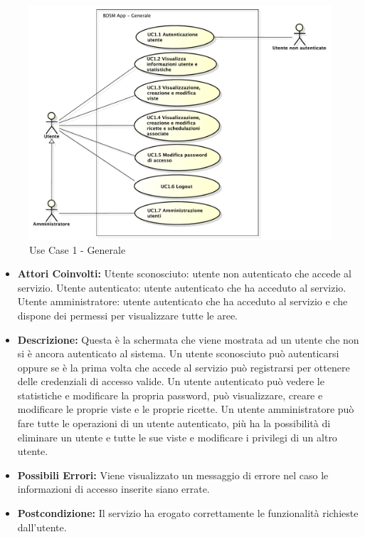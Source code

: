 \begin{figure}[htbp]
    \centering
    \centerline{\includegraphics[scale=0.5]{./images/UC1.pdf}}
    \caption{Use Case 1 - Generale}
\end{figure}

\begin{itemize}

    \item \textbf{Attori Coinvolti:}
    Utente sconosciuto: utente non autenticato che accede al servizio.
    Utente autenticato: utente autenticato che ha acceduto al servizio.
    Utente amministratore: utente autenticato che ha acceduto al servizio e che dispone dei permessi per visualizzare tutte le aree.

    \item \textbf{Descrizione:}
    Questa è la schermata che viene mostrata ad un utente che non si è ancora autenticato al sistema.
    Un utente sconosciuto può autenticarsi oppure se è la prima volta che accede al servizio può registrarsi per ottenere delle credenziali di accesso valide.
    Un utente autenticato può vedere le statistiche e modificare la propria password, può visualizzare, creare e modificare le proprie viste e le proprie ricette.
    Un utente amministratore può fare tutte le operazioni di un utente autenticato, più ha la possibilità di eliminare un utente e tutte le sue viste e modificare i privilegi di un altro utente.

    \item \textbf{Possibili Errori:}
    Viene visualizzato un messaggio di errore nel caso le informazioni di accesso inserite siano errate.

    \item \textbf{Postcondizione:}
    Il servizio ha erogato correttamente le funzionalità richieste dall'utente.

\end{itemize}


